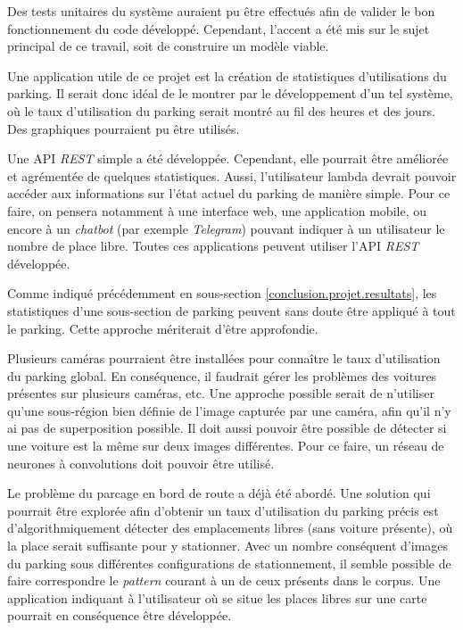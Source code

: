 Des tests unitaires du système auraient pu être effectués afin de valider le bon fonctionnement du code développé. Cependant, l'accent a été mis sur le sujet principal de ce travail, soit de construire un modèle viable.

Une application utile de ce projet est la création de statistiques d'utilisations du parking. Il serait donc idéal de le montrer par le développement d'un tel système, où le taux d'utilisation du parking serait montré au fil des heures et des jours. Des graphiques pourraient pu être utilisés.

Une API \textit{REST} simple a été développée. Cependant, elle pourrait être améliorée et agrémentée de quelques statistiques. Aussi, l'utilisateur lambda devrait pouvoir accéder aux informations sur l'état actuel du parking de manière simple. Pour ce faire, on pensera notamment à une interface web, une application mobile, ou encore à un \textit{chatbot} (par exemple \textit{Telegram}) pouvant indiquer à un utilisateur le nombre de place libre. Toutes ces applications peuvent utiliser l'API \textit{REST} développée. 

Comme indiqué précédemment en sous-section \ref{conclusion.projet.resultats}, les statistiques d'une sous-section de parking peuvent sans doute être appliqué à tout le parking. Cette approche mériterait d'être approfondie. 

Plusieurs caméras pourraient être installées pour connaître le taux d'utilisation du parking global. En conséquence, il faudrait gérer les problèmes des voitures présentes sur plusieurs caméras, etc. Une approche possible serait de n'utiliser qu'une sous-région bien définie de l'image capturée par une caméra, afin qu'il n'y ai pas de superposition possible. Il doit aussi pouvoir être possible de détecter si une voiture est la même sur deux images différentes. Pour ce faire, un réseau de neurones à convolutions doit pouvoir être utilisé.

Le problème du parcage en bord de route a déjà été abordé. Une solution qui pourrait être explorée afin d'obtenir un taux d'utilisation du parking précis est d'algorithmiquement détecter des emplacements libres (sans voiture présente), où la place serait suffisante pour y stationner. Avec un nombre conséquent d'images du parking sous différentes configurations de stationnement, il semble possible de faire correspondre le \textit{pattern} courant à un de ceux présents dans le corpus. Une application indiquant à l'utilisateur où se situe les places libres sur une carte pourrait en conséquence être développée.


